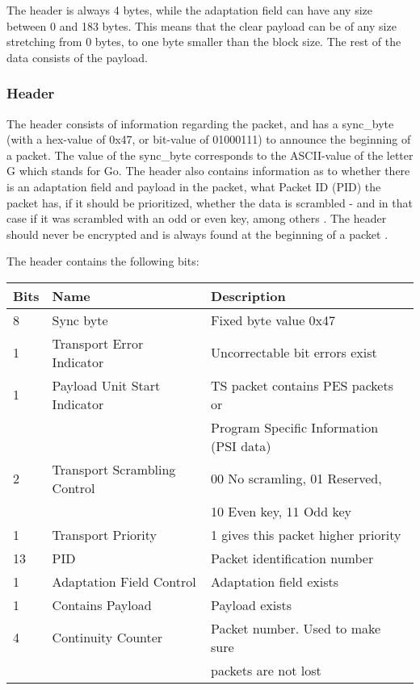 The header is always 4 bytes, while the adaptation field can have any 
size between 0 and 183 bytes. This means that the clear payload can 
be of any size stretching from 0 bytes, to one byte smaller than the 
block size. The rest of the data consists of the payload.

\subsubsection{Header}
The header consists of information regarding the packet, and has a 
sync\_byte (with a hex-value of 0x47, or bit-value of 01000111) to 
announce the beginning of a packet. The value of the sync\_byte 
corresponds to the ASCII-value of the letter G which stands for Go.
The header also contains information as to whether there is an 
adaptation field and payload in the packet, what Packet ID (PID) the 
packet has, if it should be prioritized, whether the data is 
scrambled - and in that case if it was scrambled with an odd or even 
key, among others \citep[pp. 25--26]{etsiMPEG:2009}. The header should 
never be encrypted and is always found at the beginning of a packet 
\citep[pp. 10--11]{DVB:2013}.

The header contains the following bits:
\begin{longtable}{| l | l | l |}
  \hline
  Bits & Name & Description \\ \hline
  8 & Sync byte & Fixed byte value 0x47 \\ \hline
  1 & Transport Error Indicator & Uncorrectable bit errors exist \\ 
  \hline
  1 & Payload Unit Start Indicator & TS packet contains PES packets or\\
  & & Program Specific Information (PSI data)\\ \hline
  2 & Transport Scrambling Control & 00 No scramling, 01 Reserved, \\
  & & 10 Even key, 11 Odd key \\ \hline
  1 & Transport Priority & 1 gives this packet higher priority \\ 
  \hline
  13 & PID & Packet identification number \\ \hline
  1 & Adaptation Field Control & Adaptation field exists \\ \hline
  1 & Contains Payload & Payload exists \\ \hline
  4 & Continuity Counter & Packet number. Used to make sure \\
  & & packets are not lost\\ \hline
\end{longtable}

